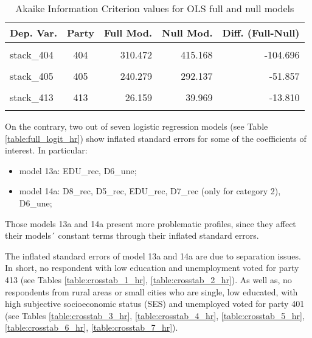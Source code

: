\documentclass[
]{article}
\providecommand{\tightlist}{%
  \setlength{\itemsep}{0pt}\setlength{\parskip}{0pt}}
\begin{document}
\begin{table}[!h]

\caption{\label{tab:unnamed-chunk-32}Akaike Information Criterion values for OLS full and null models 
        \label{table:ols_aic_hr}}
\centering
\begin{tabular}[t]{lcrrr}
\toprule
Dep. Var. & Party & Full Mod. & Null Mod. & Diff. (Full-Null)\\
\midrule
\cellcolor{gray!6}{stack\_412} & \cellcolor{gray!6}{412} & \cellcolor{gray!6}{666.758} & \cellcolor{gray!6}{739.344} & \cellcolor{gray!6}{-72.586}\\
stack\_404 & 404 & 310.472 & 415.168 & -104.696\\
\cellcolor{gray!6}{stack\_414} & \cellcolor{gray!6}{414} & \cellcolor{gray!6}{293.685} & \cellcolor{gray!6}{342.782} & \cellcolor{gray!6}{-49.098}\\
stack\_405 & 405 & 240.279 & 292.137 & -51.857\\
\cellcolor{gray!6}{stack\_406} & \cellcolor{gray!6}{406} & \cellcolor{gray!6}{140.904} & \cellcolor{gray!6}{166.996} & \cellcolor{gray!6}{-26.092}\\
\addlinespace
stack\_413 & 413 & 26.159 & 39.969 & -13.810\\
\cellcolor{gray!6}{stack\_401} & \cellcolor{gray!6}{401} & \cellcolor{gray!6}{-228.581} & \cellcolor{gray!6}{-153.443} & \cellcolor{gray!6}{-75.137}\\
\bottomrule
\end{tabular}
\end{table}

On the contrary, two out of seven logistic regression models (see Table \ref{table:full_logit_hr}) show
inflated standard errors for some of the coefficients of interest. In particular:

\begin{itemize}
\tightlist
\item
  model 13a: EDU\_rec, D6\_une;
\item
  model 14a: D8\_rec, D5\_rec, EDU\_rec, D7\_rec (only for category 2), D6\_une;
\end{itemize}

Those models 13a and 14a present more problematic profiles, since they affect their models´ constant terms through their inflated standard errors.

The inflated standard errors of model 13a and 14a are due to separation issues. In short, no respondent with low education and unemployment
voted for party 413 (see Tables \ref{table:crosstab_1_hr}, \ref{table:crosstab_2_hr}). As well as, no respondents from rural areas or small cities who are single, low educated, with high subjective socioeconomic status (SES) and unemployed voted for party 401 (see Tables \ref{table:crosstab_3_hr}, \ref{table:crosstab_4_hr}, \ref{table:crosstab_5_hr}, \ref{table:crosstab_6_hr}, \ref{table:crosstab_7_hr}).
\end{document}
